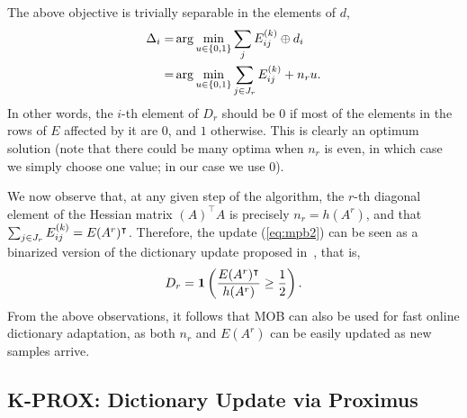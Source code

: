 \documentclass[twocolumn]{IEEEtran}
\theoremstyle{definition}
\def\transp{^\intercal}
\newcommand{\refeq}[1]{(\ref{#1})}
\begin{document}
The above objective is trivially separable in the elements of $d$,
 \begin{eqnarray}
 \Delta_i  =& \arg\min_{u \in \{0,1\}} \sum_j E_{ij}\iter{k} \oplus d_i\\
 =& \arg\min_{u \in \{0,1\}} \sum_{j\in J_r} E_{ij}\iter{k} + n_r u.
\label{eq:mob2}
 \end{eqnarray}
In other words, the $i$-th element of $D_r$ should be $0$ if most of the elements in the rows of $E$ affected by it are $0$, and $1$ otherwise. 
This is clearly an optimum solution (note that there could be many optima  when $n_r$ is even, in which case we simply choose one value; in our case we use $0$).

We now observe that, at any given step of the algorithm, the $r$-th diagonal element of the Hessian matrix $(A)\transp{A}$ is precisely $n_r=h(A^r)$, and that $\sum_{j\in J_r} E_{ij}\iter{k}=E(A^r)\transp$. Therefore, the update \refeq{eq:mpb2} can be seen as a binarized version of the dictionary update proposed in~\cite{online-dl}, that is, 
$$D_r = \indicator\left(\frac{E(A^r)\transp}{h(A^r)} \geq \frac{1}{2}\right).$$
From the above observations, it follows that MOB can also be used for fast online dictionary adaptation, as both $n_r$ and $E(A^r)$ can be easily updated as new samples arrive.

\subsection{K-PROX: Dictionary Update via Proximus}
\label{sec:bdl:k-prox}
\end{document}
